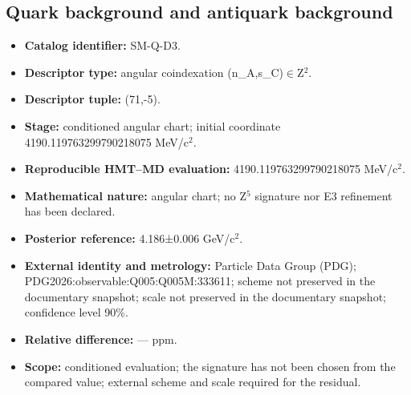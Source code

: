 \subsection{Quark background and antiquark background}
\begin{itemize}
\item \textbf{Catalog identifier:} SM-Q-D3.
\item \textbf{Descriptor type:} angular coindexation (n\_A,s\_C)\(\in\)Z\({}^{2}\).
\item \textbf{Descriptor tuple:} (71,-5).
\item \textbf{Stage:} conditioned angular chart; initial coordinate 4190.119763\allowbreak{}299790\allowbreak{}218075 MeV/c\({}^{2}\).
\item \textbf{Reproducible HMT--MD evaluation:} 4190.119763\allowbreak{}299790\allowbreak{}218075 MeV/c\({}^{2}\).
\item \textbf{Mathematical nature:} angular chart; no Z\({}^{5}\) signature nor E3 refinement has been declared.
\item \textbf{Posterior reference:} 4.186±\allowbreak{}0.006 GeV/c\({}^{2}\).
\item \textbf{External identity and metrology:} Particle Data Group (PDG); PDG2026:\allowbreak{}observable:\allowbreak{}Q005:\allowbreak{}Q005M:\allowbreak{}333611; scheme not preserved in the documentary snapshot; scale not preserved in the documentary snapshot; confidence level 90\%.
\item \textbf{Relative difference:} --- ppm.
\item \textbf{Scope:} conditioned evaluation; the signature has not been chosen from the compared value; external scheme and scale required for the residual.
\end{itemize}
